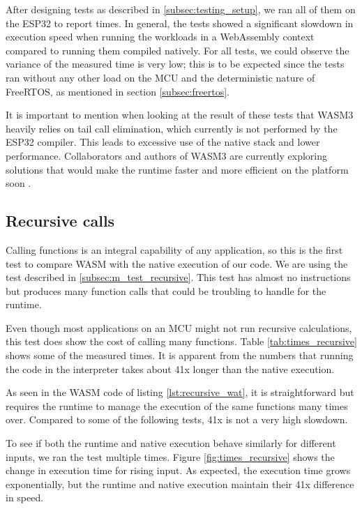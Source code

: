 After designing tests as described in \ref{subsec:testing_setup}, we ran all of them on the ESP32 to report times. In general, the tests showed a significant slowdown in execution speed when running the workloads in a WebAssembly context compared to running them compiled natively. For all tests, we could observe the variance of the measured time is very low; this is to be expected since the tests ran without any other load on the MCU and the deterministic nature of FreeRTOS, as mentioned in section \ref{subsec:freertos}.

It is important to mention when looking at the result of these tests that WASM3 heavily relies on tail call elimination, which currently is not performed by the ESP32 compiler. This leads to excessive use of the native stack and lower performance. Collaborators and authors of WASM3 are currently exploring solutions that would make the runtime faster and more efficient on the platform soon \autocite{grokhotkov_esp32-idf_nodate}.

\subsection{Recursive calls}

Calling functions is an integral capability of any application, so this is the first test to compare WASM with the native execution of our code. We are using the test described in \ref{subsec:m_test_recursive}. This test has almost no instructions but produces many function calls that could be troubling to handle for the runtime.

Even though most applications on an MCU might not run recursive calculations, this test does show the cost of calling many functions. Table \ref{tab:times_recursive} shows some of the measured times. It is apparent from the numbers that running the code in the interpreter takes about 41x longer than the native execution.

As seen in the WASM code of listing \ref{lst:recursive_wat}, it is straightforward but requires the runtime to manage the execution of the same functions many times over. Compared to some of the following tests, 41x is not a very high slowdown.

To see if both the runtime and native execution behave similarly for different inputs, we ran the test multiple times. Figure \ref{fig:times_recursive} shows the change in execution time for rising input. As expected, the execution time grows exponentially, but the runtime and native execution maintain their 41x difference in speed.


